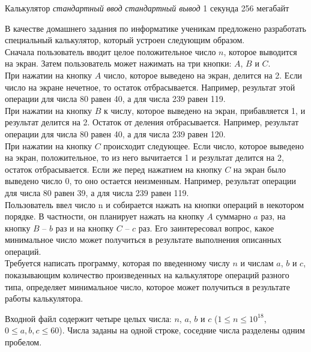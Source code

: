 \begin{problem}%
{Калькулятор}%
{\textsl{стандартный ввод}}%
{\textsl{стандартный вывод}}%
{1 секунда}%
{256 мегабайт}{}

В качестве домашнего задания по информатике ученикам предложено разработать специальный калькулятор, который устроен следующим образом.\\

Сначала пользователь вводит целое положительное число $n$, которое выводится на экран. Затем пользователь может нажимать на три кнопки: $A$, $B$ и $C$.\\

При нажатии на кнопку $A$ число, которое выведено на экран, делится на 2. Если число на экране нечетное, то остаток отбрасывается. Например, результат этой операции для числа 80 равен 40, а для числа 239 равен 119.\\

При нажатии на кнопку $B$ к числу, которое выведено на экран, прибавляется 1, и результат делится на 2. Остаток от деления отбрасывается. Например, результат операции для числа 80 равен 40, а для числа 239 равен 120.\\

При нажатии на кнопку $C$ происходит следующее. Если число, которое выведено на экран, положительное, то из него вычитается 1 и результат делится на 2, остаток отбрасывается. Если же перед нажатием на кнопку $C$ на экран было выведено число 0, то оно остается неизменным. Например, результат операции для числа 80 равен 39, а для числа 239
равен 119.\\

Пользователь ввел число n и собирается нажать на кнопки операций в некотором порядке. В частности, он планирует нажать на кнопку $A$ суммарно $a$ раз, на кнопку $B$ – $b$ раз
и на кнопку $C$ – $c$ раз. Его заинтересовал вопрос, какое минимальное число может получиться в результате выполнения описанных операций.\\

Требуется написать программу, которая по введенному числу $n$ и числам $a$, $b$ и $c$, показывающим количество произведенных на калькуляторе операций разного типа, определяет минимальное число, которое может получиться в результате работы калькулятора.

\InputFile

Входной файл содержит четыре целых числа: $n$, $a$, $b$ и $c$ ($1 \le n \le 10^{18}$, $0 \le a, b, c \le 60$). Числа заданы на одной строке, соседние числа разделены одним пробелом.


\end{problem}

